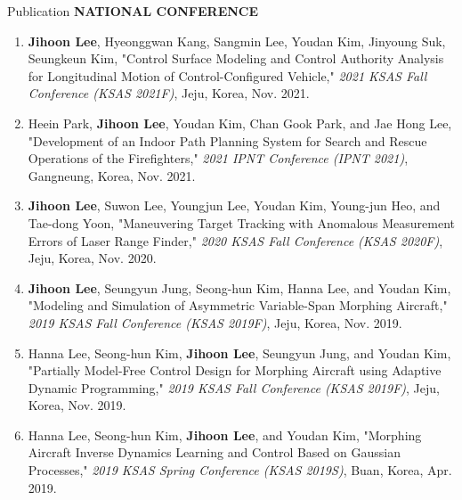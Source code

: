 \documentclass{resume}
\begin{document}
\begin{rSection}{Publication}
	\textbf{NATIONAL CONFERENCE}
	\begin{enumerate}\renewcommand{\labelenumi}{[NC\theenumi]}
		\item \textbf{\color{coolblack}Jihoon Lee}, Hyeonggwan Kang, Sangmin Lee, Youdan Kim, Jinyoung Suk, Seungkeun Kim, "Control Surface Modeling and Control Authority Analysis for Longitudinal Motion of Control-Configured Vehicle," \textit{2021 KSAS Fall Conference (KSAS 2021F)}, Jeju, Korea, Nov. 2021.
		\newline[\href{https://www.dbpia.co.kr/journal/articleDetail?nodeId=NODE11031427}{Link}] 
		
		\item Heein Park, \textbf{\color{coolblack}Jihoon Lee}, Youdan Kim, Chan Gook Park, and Jae Hong Lee, "Development of an Indoor Path Planning System for Search and Rescue Operations of the Firefighters," \textit{2021 IPNT Conference (IPNT 2021)}, Gangneung, Korea, Nov. 2021. 
		\newline[\href{http://ipnt.or.kr/2021proc/33?bo_table=2021proc&wr_id=33&rewrite=1&device=pc}{Link}] 
		
		\item \textbf{\color{coolblack}Jihoon Lee}, Suwon Lee, Youngjun Lee, Youdan Kim, Young-jun Heo, and Tae-dong Yoon, "Maneuvering Target Tracking with Anomalous Measurement Errors of Laser Range Finder," \textit{2020 KSAS Fall Conference (KSAS 2020F)}, Jeju, Korea, Nov. 2020. 
		\newline[\href{https://www.dbpia.co.kr/Journal/articleDetail?nodeId=NODE10442093}{Link}] 
		
		\item \textbf{\color{coolblack}Jihoon Lee}, Seungyun Jung, Seong-hun Kim, Hanna Lee, and Youdan Kim, "Modeling and Simulation of Asymmetric Variable-Span Morphing Aircraft," \textit{2019 KSAS Fall Conference (KSAS 2019F)}, Jeju, Korea, Nov. 2019. 
		\newline[\href{http://www.dbpia.co.kr/journal/articleDetail?nodeId=NODE09317850}{Link}] 
		
		\item Hanna Lee, Seong-hun Kim, \textbf{\color{coolblack}Jihoon Lee}, Seungyun Jung, and Youdan Kim, "Partially Model-Free Control Design for Morphing Aircraft using Adaptive Dynamic Programming," \textit{2019 KSAS Fall Conference (KSAS 2019F)}, Jeju, Korea, Nov. 2019. 
		\newline[\href{http://www.dbpia.co.kr/journal/articleDetail?nodeId=NODE09317891}{Link}] 
		
		\item Hanna Lee, Seong-hun Kim, \textbf{\color{coolblack}Jihoon Lee}, and Youdan Kim, "Morphing Aircraft Inverse Dynamics Learning and Control Based on Gaussian Processes," \textit{2019 KSAS Spring Conference (KSAS 2019S)}, Buan, Korea, Apr. 2019. 
		\newline[\href{http://www.dbpia.co.kr/journal/articleDetail?nodeId=NODE08753032}{Link}] 
		

\end{enumerate}
\end{rSection}
\end{document}
